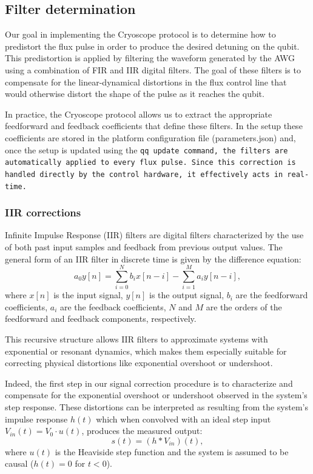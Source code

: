 \subsection{Filter determination}
Our goal in implementing the Cryoscope protocol is to determine how to predistort the flux pulse in order to produce the desired detuning on the qubit. 
This predistortion is applied by filtering the waveform generated by the AWG using a combination of FIR and IIR digital filters. 
The goal of these filters is to compensate for the linear-dynamical distortions in the flux control line that would otherwise distort the shape of the pulse as it reaches the qubit.

In practice, the Cryoscope protocol allows us to extract the appropriate feedforward and feedback coefficients that define these filters. 
In the \Qibo setup these coefficients are stored in the platform configuration file (parameters.json) and, once the setup is updated using the \tt{qq update} command, the filters are automatically applied to every flux pulse. 
Since this correction is handled directly by the control hardware, it effectively acts in real-time.

\subsubsection{IIR corrections}

Infinite Impulse Response (IIR) filters are digital filters characterized by the use of both past input samples and feedback from previous output values.
The general form of an IIR filter in discrete time is given by the difference equation:
\begin{equation}
        a_0 y[n] = \sum_{i=0}^{N} b_i x[n - i] - \sum_{i=1}^{M} a_i y[n - i],
\end{equation}
where $x[n]$ is the input signal, $y[n]$ is the output signal, $b_i$ are the feedforward coefficients, $a_i$ are the feedback coefficients, $N$ and $M$ are the orders of the feedforward and feedback components, respectively.

This recursive structure allows IIR filters to approximate systems with exponential or resonant dynamics, which makes them especially suitable for correcting physical distortions like exponential overshoot or undershoot.

Indeed, the first step in our signal correction procedure is to characterize and compensate for the exponential overshoot or undershoot observed in the system's step response. 
These distortions can be interpreted as resulting from the system's impulse response $h(t)$ which when convolved with an ideal step input $V_{in}(t) = V_0\cdot u(t)$, produces the measured output:
\begin{equation}
    s(t) = (h \ast V_{in})(t),
\end{equation}
where $u(t)$ is the Heaviside step function and the system is assumed to be causal ($h(t)=0$ for $t<0$).

